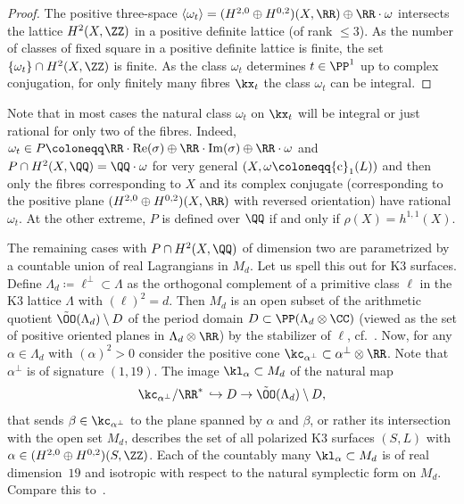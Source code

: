 \begin{proof}
The positive three-space $\langle\omega_t\rangle=(H^{2,0}\oplus H^{0,2})(X,\RR)\oplus\RR\cdot\omega$ intersects the lattice $H^2(X,\ZZ)$ in a positive definite lattice (of rank $\leq 3$). As the number of classes of fixed square in a positive definite lattice is finite, the set $\{\omega_t\}\cap H^2(X,\ZZ)$ is finite. As the class $\omega_t$ determines $t\in\PP^1$ up to complex conjugation, for only finitely many fibres $\kx_t$ the class $\omega_t$ can be integral.
\end{proof}

\begin{rema}\label{rem:Lagr}
Note that in most cases the natural class $\omega_t$ on $\kx_t$ will be integral or just rational for only two of the fibres. Indeed, $\omega_t\in P\coloneqq
\RR\cdot{\rm Re}(\sigma)\oplus\RR\cdot{\rm Im}(\sigma)\oplus\RR\cdot\omega$ and $P\cap H^2(X,\QQ)=\QQ\cdot\omega$ for very general $(X,\omega\coloneqq{\rm c}_1(L))$ and then only the fibres corresponding to $X$ and its complex conjugate (corresponding to the positive plane $(H^{2,0}\oplus H^{0,2})(X,\RR)$ with reversed orientation) have rational $\omega_t$. At the other extreme, $P$ is defined over $\QQ$ if and only if $\rho(X)=h^{1,1}(X)$.

The remaining cases with $P\cap H^2(X,\QQ)$ of dimension two are parametrized by a countable union of real Lagrangians in $M_d$. Let us spell this out for K3 surfaces. Define $\Lambda_d\coloneqq \ell^\perp\subset\Lambda$ as the orthogonal complement of a primitive class $\ell$ in the K3 lattice $\Lambda$ with $(\ell)^2=d$. Then $M_d$ is an open subset of the arithmetic quotient $\tilde\OO(\Lambda_d)\setminus D$ of the period domain $D\subset\PP(\Lambda_d\otimes\CC)$ (viewed as the set of positive oriented planes in $\Lambda_d\otimes\RR$) by the stabilizer of $\ell$, cf.~\cite[Chapter~6]{HuyK3}. Now, for any $\alpha\in\Lambda_d$ with $(\alpha)^2>0$ consider the positive cone $\kc_{\alpha^\perp}\subset\alpha^\perp\otimes\RR$. Note that $\alpha^\perp$ is of signature $(1,19)$. The image $\kl_\alpha\subset M_d$ of the natural map
\[
\kc_{\alpha^\perp}/\RR^*\,\hookrightarrow D\to \tilde\OO(\Lambda_d)\setminus D,
\]
that sends $\beta\in\kc_{\alpha^\perp}$ to the plane spanned by $\alpha$ and $\beta$, or rather its intersection with the open set $M_d$, describes the set of all polarized K3 surfaces $(S,L)$ with $\alpha\in (H^{2,0}\oplus H^{0,2})(S,\ZZ)$. Each of the countably many $\kl_\alpha\subset M_d$ is of real dimension~$19$ and isotropic with respect to the natural symplectic form on $M_d$. Compare this to~\cite[Remark~5.7]{BL}.
\end{rema}


